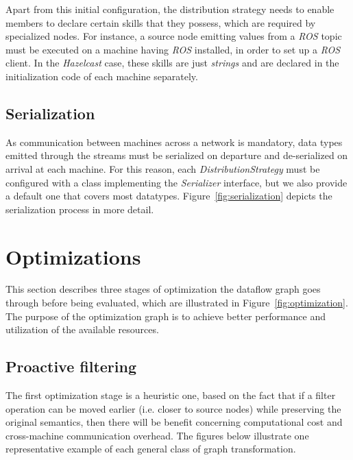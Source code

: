 \documentclass[sigplan,review,anonymous,screen]{acmart}
\begin{document}
Apart from this initial configuration, the distribution strategy needs to enable
members to declare certain skills that they possess, which are required by
specialized nodes. For instance, a source node emitting values from a
\textit{ROS} topic must be executed on a machine having \textit{ROS} installed,
in order to set up a \textit{ROS} client. In the \textit{Hazelcast} case, these
skills are just \textit{strings} and are declared in the initialization code of
each machine separately.

\subsection{Serialization}
As communication between machines across a network is mandatory, data types
emitted through the streams must be serialized on departure and de-serialized on
arrival at each machine. For this reason, each \textit{DistributionStrategy}
must be configured with a class implementing the \textit{Serializer} interface,
but we also provide a default one that covers most datatypes. Figure~\ref{fig:serialization}
depicts the serialization process in more detail.


\section{Optimizations} \label{sec:optimization}

This section describes three stages of optimization the dataflow graph goes
through before being evaluated, which are illustrated in Figure~\ref{fig:optimization}.
The purpose of the optimization graph is to achieve better performance and
utilization of the available resources.


\subsection{Proactive filtering}

The first optimization stage is a heuristic one, based on the fact that if a
filter operation can be moved earlier (i.e. closer to source nodes) while
preserving the original semantics, then there will be benefit concerning
computational cost and cross-machine communication overhead. The figures below
illustrate one representative example of each general class of
graph transformation.
\end{document}

